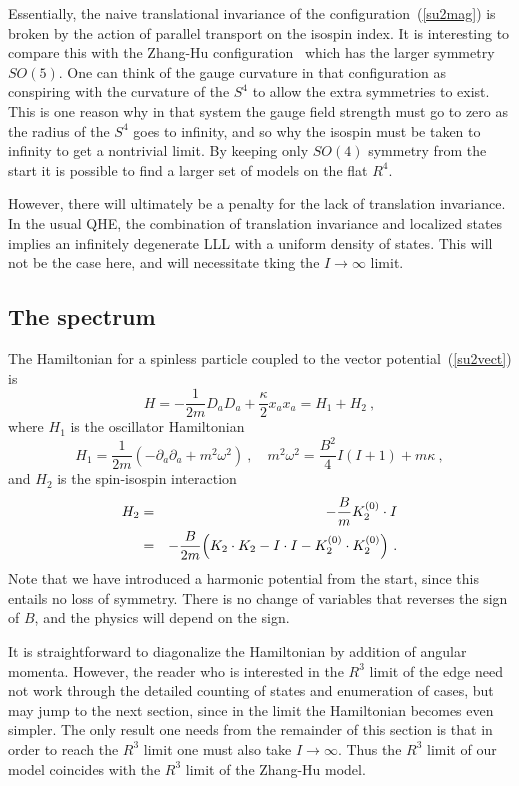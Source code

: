 \documentclass[a4paper,12pt]{article}
\newcommand{\R}{R}
\begin{document}
Essentially, the naive translational invariance of the
configuration~(\ref{su2mag}) is broken by the action of parallel transport
on the isospin index. 
It is interesting to compare this with the Zhang-Hu
configuration~\cite{hz1} which has the larger symmetry $SO(5)$.  One can
think of the gauge curvature in that configuration as conspiring with the
curvature of the
$S^4$ to allow the extra symmetries to exist.  This is one reason why in
that system the gauge field strength must go to zero as the radius of the
$S^4$ goes to infinity, and so why the isospin must be taken to infinity
to get a nontrivial limit.  By keeping only $SO(4)$ symmetry from
the start it is possible to find a larger set of models on the flat $\R^4$.

However, there will ultimately be a penalty for the lack of translation
invariance.  In the usual QHE, the combination of translation invariance and
localized states implies an infinitely degenerate LLL with a uniform density
of states.  This will not be the case here, and will necessitate tking the $I
\to \infty$ limit.


\subsection{The spectrum}

The Hamiltonian for a spinless particle coupled to the vector
potential~(\ref{su2vect}) is
\begin{equation}
H = -\frac{1}{2m} D_a D_a + \frac{\kappa}{2} x_a x_a = H_1 + H_2\ ,
\label{su2ham}
\end{equation}
where $H_1$ is the oscillator Hamiltonian
\begin{equation}
H_1 = \frac{1}{2m} (-\partial_a\partial_a + m^2 \omega^2 )\ ,
\quad
m^2 \omega^2 = \frac{B^2}{4} I (I+1) + m\kappa\ ,
\end{equation}
and $H_2$ is the spin-isospin interaction
\begin{eqnarray}
H_2 &=& -\frac{B}{m} K_2^{(0)} \cdot I \nonumber\\
&=& -\frac{B}{2m} \Bigl(K_2 \cdot K_2 - I \cdot I - K_2^{(0)} \cdot
K_2^{(0)}\Bigr)\ .
\end{eqnarray}
Note that we have introduced a harmonic potential from the start, since
this entails no loss of symmetry.  There is no change of variables that
reverses the sign of $B$, and the physics will depend on the sign.

It is straightforward to diagonalize the Hamiltonian by addition of
angular momenta.  However, the reader who is interested in the $\R^3$
limit of the edge need not work through the detailed counting of states and
enumeration of cases, but may jump to the next section, since in the limit
the Hamiltonian becomes even simpler.  The only result one needs from the
remainder of this section is that in order to reach the $\R^3$ limit one
must also take $I \to \infty$.  Thus the $\R^3$ limit of our model
coincides with the $\R^3$ limit of the Zhang-Hu model.
\end{document}
